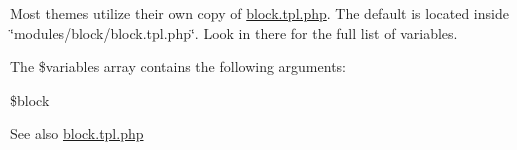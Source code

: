Most themes utilize their own copy of \hyperlink{block_8tpl_8php}{block.tpl.php}. The default is located inside \char`\"{}modules/block/block.tpl.php\char`\"{}. Look in there for the full list of variables.

The \$variables array contains the following arguments:
\begin{DoxyItemize}
\item \$block
\end{DoxyItemize}

\begin{DoxySeeAlso}{See also}
\hyperlink{block_8tpl_8php}{block.tpl.php} 
\end{DoxySeeAlso}
